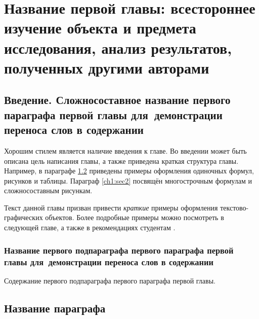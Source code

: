 \chapter{Название первой главы: всестороннее изучение объекта и предмета исследования, анализ результатов, полученных другими авторами} \label{ch1}

\section{Введение. Сложносоставное название первого параграфа первой главы для~демонстрации переноса слов в содержании} \label{ch1:intro}

Хорошим стилем является наличие введения к главе. Во введении может быть описана цель написания главы, а также приведена краткая структура главы. Например, в параграфе \ref{ch1:sec1} приведены примеры оформления одиночных формул, рисунков и таблицы. Параграф \ref{ch1:sec2} посвящён многострочным формулам и сложносоставным рисункам.

Текст данной главы призван привести \textit{краткие} примеры оформления текстово-графических объектов. Более подробные примеры можно посмотреть в следующей главе, а также в рекомендациях студентам \cite{spbpu-student-thesis-template-author-guide}. 


\subsection{Название первого подпараграфа первого параграфа первой главы для~демонстрации переноса слов в содержании} %

Содержание первого подпараграфа первого параграфа первой главы.
	
\section{Название параграфа} \label{ch1:sec1}


